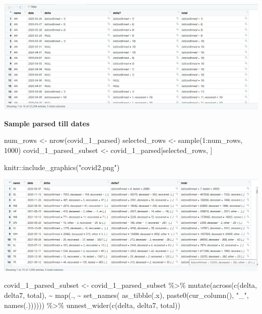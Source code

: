 \documentclass[
]{article}
\newenvironment{Shaded}{}{}
\newcommand{\DecValTok}[1]{\textcolor[rgb]{0.00,0.00,0.80}{#1}}
\newcommand{\FunctionTok}[1]{#1}
\newcommand{\NormalTok}[1]{#1}
\newcommand{\OtherTok}[1]{\textcolor[rgb]{1.00,0.25,0.00}{#1}}
\newcommand{\SpecialCharTok}[1]{\textcolor[rgb]{0.00,0.50,0.50}{#1}}
\newcommand{\StringTok}[1]{\textcolor[rgb]{0.01,0.42,0.03}{#1}}
\begin{document}
\includegraphics[width=1\linewidth]{covid}

\textbf{Sample parsed till dates}

\begin{Shaded}
\begin{Highlighting}[]
\NormalTok{num\_rows }\OtherTok{\textless{}{-}} \FunctionTok{nrow}\NormalTok{(covid\_1\_parsed)}
\NormalTok{selected\_rows }\OtherTok{\textless{}{-}} \FunctionTok{sample}\NormalTok{(}\DecValTok{1}\SpecialCharTok{:}\NormalTok{num\_rows, }\DecValTok{1000}\NormalTok{)}
\NormalTok{covid\_1\_parsed\_subset }\OtherTok{\textless{}{-}}\NormalTok{ covid\_1\_parsed[selected\_rows, ]}

\NormalTok{knitr}\SpecialCharTok{::}\FunctionTok{include\_graphics}\NormalTok{(}\StringTok{"covid2.png"}\NormalTok{)}
\end{Highlighting}
\end{Shaded}

\includegraphics[width=1\linewidth]{covid2}

\begin{Shaded}
\begin{Highlighting}[]
\NormalTok{covid\_1\_parsed\_subset }\OtherTok{\textless{}{-}}\NormalTok{ covid\_1\_parsed\_subset }\SpecialCharTok{\%\textgreater{}\%}
  \FunctionTok{mutate}\NormalTok{(}\FunctionTok{across}\NormalTok{(}\FunctionTok{c}\NormalTok{(delta, delta7, total), }\SpecialCharTok{\textasciitilde{}} \FunctionTok{map}\NormalTok{(., }\SpecialCharTok{\textasciitilde{}} \FunctionTok{set\_names}\NormalTok{(  }\FunctionTok{as\_tibble}\NormalTok{(.x), }\FunctionTok{paste0}\NormalTok{(}\FunctionTok{cur\_column}\NormalTok{(), }\StringTok{"\_"}\NormalTok{, }\FunctionTok{names}\NormalTok{(.)))))) }\SpecialCharTok{\%\textgreater{}\%}
  \FunctionTok{unnest\_wider}\NormalTok{(}\FunctionTok{c}\NormalTok{(delta, delta7, total))}
\end{Highlighting}
\end{Shaded}
\end{document}

